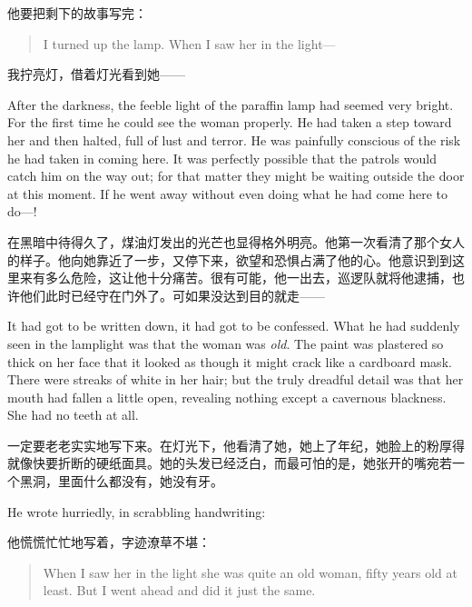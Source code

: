\begin{paracol}{2}
\switchcolumn

他要把剩下的故事写完：

\switchcolumn*

\begin{quotation}
I turned up the lamp. When I saw her in the light---
\end{quotation}

\switchcolumn

我拧亮灯，借着灯光看到她——

\switchcolumn*

After the darkness, the feeble light of the paraffin lamp had seemed
very bright. For the first time he could see the woman properly. He had
taken a step toward her and then halted, full of lust and terror. He was
painfully conscious of the risk he had taken in coming here. It was
perfectly possible that the patrols would catch him on the way out; for
that matter they might be waiting outside the door at this moment. If he
went away without even doing what he had come here to do---!

\switchcolumn

在黑暗中待得久了，煤油灯发出的光芒也显得格外明亮。他第一次看清了那个女人的样子。他向她靠近了一步，又停下来，欲望和恐惧占满了他的心。他意识到到这里来有多么危险，这让他十分痛苦。很有可能，他一出去，巡逻队就将他逮捕，也许他们此时已经守在门外了。可如果没达到目的就走——

\switchcolumn*

It had got to be written down, it had got to be confessed. What he had
suddenly seen in the lamplight was that the woman was \emph{old}. The
paint was plastered so thick on her face that it looked as though it
might crack like a cardboard mask. There were streaks of white in her
hair; but the truly dreadful detail was that her mouth had fallen a
little open, revealing nothing except a cavernous blackness. She had no
teeth at all.

\switchcolumn

一定要老老实实地写下来。在灯光下，他看清了她，她上了年纪，她脸上的粉厚得就像快要折断的硬纸面具。她的头发已经泛白，而最可怕的是，她张开的嘴宛若一个黑洞，里面什么都没有，她没有牙。

\switchcolumn*

He wrote hurriedly, in scrabbling handwriting:

\switchcolumn

他慌慌忙忙地写着，字迹潦草不堪：

\switchcolumn*

\begin{quotation}
When I saw her in the light she was quite an old woman, fifty
years old at least. But I went ahead and did it just the same.
\end{quotation}


\end{paracol}
